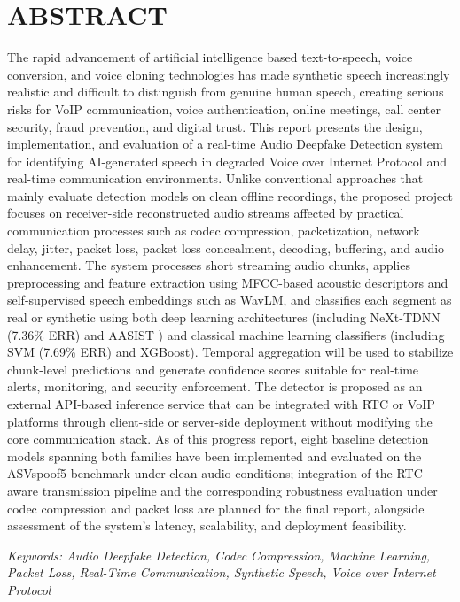 \newpage
\section*{ABSTRACT}  
{}

The rapid advancement of artificial intelligence based text-to-speech, voice conversion, and voice cloning technologies has made synthetic speech increasingly realistic and difficult to distinguish from genuine human speech, creating serious risks for VoIP communication, voice authentication, online meetings, call center security, fraud prevention, and digital trust. This report presents the design, implementation, and evaluation of a real-time Audio Deepfake Detection system for identifying AI-generated speech in degraded Voice over Internet Protocol and real-time communication environments. Unlike conventional approaches that mainly evaluate detection models on clean offline recordings, the proposed project focuses on receiver-side reconstructed audio streams affected by practical communication processes such as codec compression, packetization, network delay, jitter, packet loss, packet loss concealment, decoding, buffering, and audio enhancement. The system processes short streaming audio chunks, applies preprocessing and feature extraction using MFCC-based acoustic descriptors and self-supervised speech embeddings such as WavLM, and classifies each segment as real or synthetic using both deep learning architectures (including NeXt-TDNN (7.36\% ERR) and AASIST ) and classical machine learning classifiers (including SVM (7.69\% ERR) and XGBoost). Temporal aggregation will be used to stabilize chunk-level predictions and generate confidence scores suitable for real-time alerts, monitoring, and security enforcement. The detector is proposed as an external API-based inference service that can be integrated with RTC or VoIP platforms through client-side or server-side deployment without modifying the core communication stack. As of this progress report, eight baseline detection models spanning both families have been implemented and evaluated on the ASVspoof5 benchmark under clean-audio conditions; integration of the RTC-aware transmission pipeline and the corresponding robustness evaluation under codec compression and packet loss are planned for the final report, alongside assessment of the system's latency, scalability, and deployment feasibility.

\vspace{0.5cm}

\textit{Keywords: Audio Deepfake Detection, Codec Compression, Machine Learning, Packet Loss, Real-Time Communication, Synthetic Speech, Voice over Internet Protocol}